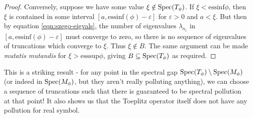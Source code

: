 \documentclass[../main.tex]{subfiles}
\begin{document}
\begin{proof}
Conversely, suppose we have some value $\xi \notin \mathrm{Spec}(T_\phi)$. If $\xi < \mathrm{essinf}\phi$, then $\xi$ is contained in some interval $[a, \mathrm{essinf}(\phi) - \varepsilon]$ for $\varepsilon > 0$ and $a < \xi$. But then by equation \ref{eqn:szego-eigvals}, the number of eigenvalues $\lambda_{n_i}$ in $[a, \mathrm{essinf}(\phi) - \varepsilon]$ must converge to zero, so there is no sequence of eigenvalues of truncations which converge to $\xi$. Thus $\xi \notin B$. The same argument can be made \emph{mutatis mutandis} for $\xi > \mathrm{esssup}\phi$, giving $B \subseteq \mathrm{Spec}(T_\phi)$ as required.
\end{proof}

This is a striking result - for any point in the spectral gap $\mathrm{Spec}(T_\phi) \setminus \mathrm{Spec}(M_\phi)$ (or indeed in $\mathrm{Spec}(M_\phi)$, but they aren't really polluting anything), we can choose a sequence of truncations such that there is guaranteed to be spectral pollution at that point! It also shows us that the Toeplitz operator itself does not have any pollution for real symbol.
\end{document}
